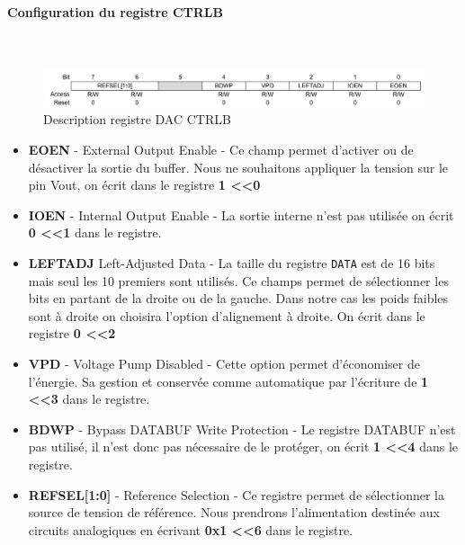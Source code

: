 \documentclass[a4paper]{article}
\begin{document}
\paragraph{Configuration du registre CTRLB} ~~\\
\begin{figure}[H]
	\centering
	\includegraphics[width=12cm]{DAC_CTRLB}
	\caption{Description registre DAC CTRLB}
\end{figure}
\begin{itemize}
	\item \textbf{EOEN} - External Output Enable - Ce champ permet d'activer ou de désactiver la sortie du buffer. Nous ne souhaitons appliquer la tension sur le pin Vout,  on écrit dans le registre \textbf{1 \textless \textless 0}\\
	\item \textbf{IOEN} - Internal Output Enable - La sortie interne n'est pas utilisée on écrit \textbf{0 \textless \textless 1} dans le registre.\\
	\item \textbf{LEFTADJ} Left-Adjusted Data - La taille du registre \texttt{DATA} est de 16 bits mais seul les 10 premiers sont utilisés. Ce champs permet de sélectionner les bits en partant de la droite ou de la gauche. Dans notre cas les poids faibles sont à droite on choisira l'option d'alignement à droite. On écrit dans le registre \textbf{0 \textless \textless 2}\\
	\item \textbf{VPD} - Voltage Pump Disabled - Cette option permet d'économiser de l'énergie. Sa gestion et conservée comme automatique par l'écriture de \textbf{1 \textless \textless 3} dans le registre.\\
	\item \textbf{BDWP} - Bypass DATABUF Write Protection - Le registre DATABUF n'est pas utilisé, il n'est donc pas nécessaire de le protéger, on écrit \textbf{1 \textless \textless 4} dans le registre.\\
	\item \textbf{REFSEL[1:0]} - Reference Selection - Ce registre permet de sélectionner la source de tension de référence. Nous prendrons l'alimentation destinée aux circuits analogiques en écrivant  \textbf{0x1 \textless \textless 6} dans le registre.\\
\end{itemize}
\end{document}
